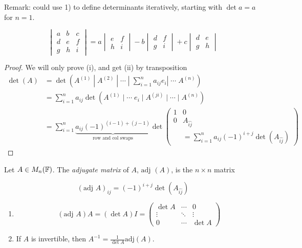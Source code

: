 \documentclass[a4paper]{article}
\begin{document}
Remark: could use 1) to define determinants iteratively, starting with $ \det a = a $ for $ n = 1 $.

\begin{eg}
\[ 	\begin{vmatrix}
		a & b & c\\
		d & e & f\\
		g & h & i
	\end{vmatrix} = a\begin{vmatrix}
	e & f\\
	h & i
	\end{vmatrix} - b \begin{vmatrix}
	d & f\\
	g & i
	\end{vmatrix} + c \begin{vmatrix}
	d & e\\
	g & h
	\end{vmatrix}  \]
\end{eg}	

\begin{proof}
	We will only prove (i), and get (ii) by transposition
	\begin{align*}
	\det(A) & = \det( A^{(1)} \; | \; A^{(2)} \; | \; \cdots\; | \; \sum_{i=1}^{n} a_{ij}e_{i} | \; \cdots\; A^{(n)} ) \\
	& = \sum_{i=1}^{n} a_{ij} \det( A^{(1)} \; | \; \cdots\; e_{i} \; | \; A^{(ji)} \; | \; \cdots \; | \; A^{(n)}  ) \\
	& = \sum_{i=1}^{n} \underbrace{a_{ij} (-1)^{(i-1) +(j-1)}}_{\text{row and col swaps}} \det \begin{pmatrix}
	1 & 0 \\
	0 & A_{\hat{ij}} \\
	& = \sum_{i=1}^{n} a_{ij} (-1)^{i+j}\det(A_{\hat{ij}})
	\end{pmatrix}
	\end{align*}
	
	
\end{proof}

\begin{defi}
	Let $ A \in M_{n}(\mathbb{F}) $. The \emph{adjugate matrix} of $ A $, $ \text{adj }(A) $, is the $ n \times n $ matrix
	
	\[ (\text{adj }A)_{ij} = (-1)^{i+j}\det(A_{\hat{ij}}) \]
	
	
\end{defi}


\begin{thm} 
	\begin{enumerate}
		\item 
		
		\[ (\text{adj }A) A = (\det A)I = \begin{pmatrix}
		\det A & \cdots & 0 \\
		\vdots & \ddots & \vdots \\
		0 & \cdots & \det A
		\end{pmatrix} \]
		
		\item If $ A $ is invertible, then $ A^{-1} = \frac{1}{\det A}\text{adj}(A) $.
		
	\end{enumerate}

\end{thm}
\end{document}
